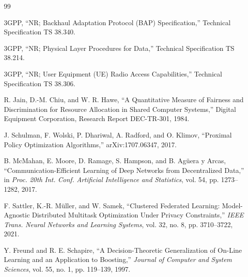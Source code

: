 \renewcommand{\bibname}{REFERENCES}
\begin{thebibliography}{99}

3GPP, ``NR; Backhaul Adaptation Protocol (BAP) Specification,''
Technical Specification TS 38.340.

3GPP, ``NR; Physical Layer Procedures for Data,''
Technical Specification TS 38.214.

3GPP, ``NR; User Equipment (UE) Radio Access Capabilities,''
Technical Specification TS 38.306.

R. Jain, D.-M. Chiu, and W. R. Hawe,
``A Quantitative Measure of Fairness and Discrimination for Resource Allocation
in Shared Computer Systems,'' Digital Equipment Corporation, Research Report
DEC-TR-301, 1984.

J. Schulman, F. Wolski, P. Dhariwal, A. Radford, and O. Klimov,
``Proximal Policy Optimization Algorithms,'' arXiv:1707.06347, 2017.

B. McMahan, E. Moore, D. Ramage, S. Hampson, and B. Ag\"uera y Arcas,
``Communication-Efficient Learning of Deep Networks from Decentralized Data,''
in \emph{Proc. 20th Int. Conf. Artificial Intelligence and Statistics},
vol. 54, pp. 1273--1282, 2017.

F. Sattler, K.-R. M\"uller, and W. Samek,
``Clustered Federated Learning: Model-Agnostic Distributed Multitask
Optimization Under Privacy Constraints,'' \emph{IEEE Trans. Neural Networks
and Learning Systems}, vol. 32, no. 8, pp. 3710--3722, 2021.

Y. Freund and R. E. Schapire,
``A Decision-Theoretic Generalization of On-Line Learning and an Application
to Boosting,'' \emph{Journal of Computer and System Sciences}, vol. 55, no. 1,
pp. 119--139, 1997.

\end{thebibliography}
